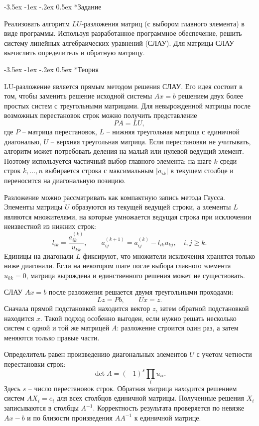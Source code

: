 \documentclass[14pt, a4paper]{article}
\makeatletter
\renewcommand\section{\@startsection {section}{1}{\parindent}%
  {-3.5ex \@plus -1ex \@minus -.2ex}%
  {0.5ex}%
  {\normalfont\Large\bfseries}}
\makeatother
\begin{document}
\section*{Задание}
Реализовать алгоритм $LU$-разложения матриц (с выбором главного элемента) в виде программы. Используя разработанное программное обеспечение, решить систему линейных алгебраических уравнений (СЛАУ). Для матрицы СЛАУ вычислить определитель и обратную матрицу.

\section*{Теория}
LU-разложение является прямым методом решения СЛАУ. Его идея состоит в том, чтобы заменить решение исходной системы $Ax=b$ решением двух более простых систем с треугольными матрицами. Для невырожденной матрицы после возможных перестановок строк можно получить представление
\[
    PA = LU,
\]
где $P$ -- матрица перестановок, $L$ -- нижняя треугольная матрица с единичной диагональю, $U$ -- верхняя треугольная матрица. Если перестановки не учитывать, алгоритм может потребовать деления на малый или нулевой ведущий элемент. Поэтому используется частичный выбор главного элемента: на шаге $k$ среди строк $k,\ldots,n$ выбирается строка с максимальным $|a_{ik}|$ в текущем столбце и переносится на диагональную позицию.

Разложение можно рассматривать как компактную запись метода Гаусса. Элементы матрицы $U$ образуются из текущей ведущей строки, а элементы $L$ являются множителями, на которые умножается ведущая строка при исключении неизвестной из нижних строк:
\[
    l_{ik}=\frac{a_{ik}^{(k)}}{u_{kk}}, \qquad
    a_{ij}^{(k+1)}=a_{ij}^{(k)}-l_{ik}u_{kj}, \quad i,j\ge k.
\]
Единицы на диагонали $L$ фиксируют, что множители исключения хранятся только ниже диагонали. Если на некотором шаге после выбора главного элемента $u_{kk}=0$, матрица вырождена и единственного решения может не существовать.

СЛАУ $Ax=b$ после разложения решается двумя треугольными проходами:
\[
    Lz = Pb, \qquad Ux = z.
\]
Сначала прямой подстановкой находится вектор $z$, затем обратной подстановкой находится $x$. Такой подход особенно выгоден, если нужно решать несколько систем с одной и той же матрицей $A$: разложение строится один раз, а затем меняются только правые части.

Определитель равен произведению диагональных элементов $U$ с учетом четности перестановки строк:
\[
    \det A = (-1)^s\prod_i u_{ii}.
\]
Здесь $s$ -- число перестановок строк. Обратная матрица находится решением систем $AX_i=e_i$ для всех столбцов единичной матрицы. Полученные решения $X_i$ записываются в столбцы $A^{-1}$. Корректность результата проверяется по невязке $Ax-b$ и по близости произведения $AA^{-1}$ к единичной матрице.
\end{document}
